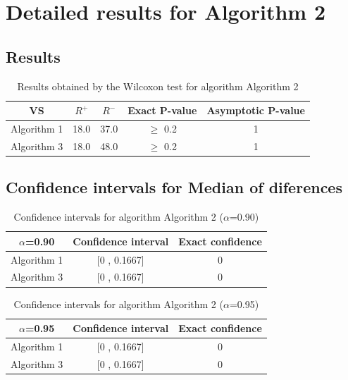 \documentclass[a4paper,10pt]{article}
\begin{document}
 \clearpage 


\section{Detailed results for Algorithm 2}


\subsection{Results}

\begin{table}[!htp]
\centering\small
\begin{tabular}{
|c|c|c|c|c|}
\hline
 VS & $R^{+}$ & $R^{-}$ & Exact P-value & Asymptotic P-value \\ \hline 
Algorithm 1 & 18.0 & 37.0 & $\geq$ 0.2 & 1\\ \hline 
Algorithm 3 & 18.0 & 48.0 & $\geq$ 0.2 & 1\\ \hline 

\end{tabular}
\caption{Results obtained by the Wilcoxon test for algorithm Algorithm 2}
\end{table}

\subsection{Confidence intervals for Median of diferences}

\begin{table}[!htp]
\centering\small
\begin{tabular}{
|c|c|c|}
\hline
 $\alpha$=0.90 & Confidence interval & Exact confidence \\ \hline 
Algorithm 1 & [0 , 0.1667] & 0\\ \hline 
Algorithm 3 & [0 , 0.1667] & 0\\ \hline 

\end{tabular}
\caption{Confidence intervals for algorithm Algorithm 2 ($\alpha$=0.90)}
\end{table}
\begin{table}[!htp]
\centering\small
\begin{tabular}{
|c|c|c|}
\hline
 $\alpha$=0.95 & Confidence interval & Exact confidence \\ \hline 
Algorithm 1 & [0 , 0.1667] & 0\\ \hline 
Algorithm 3 & [0 , 0.1667] & 0\\ \hline 

\end{tabular}
\caption{Confidence intervals for algorithm Algorithm 2 ($\alpha$=0.95)}
\end{table}
\end{document}
